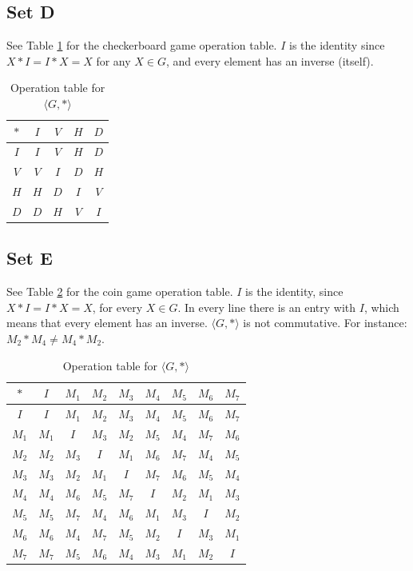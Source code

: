 \documentclass{article}
\begin{document}
\subsection{Set D}
See Table \ref{tab:checkerboard} for the checkerboard game operation table. $I$ is the identity since $X * I = I * X= X$ for any $X \in G$, and every element has an inverse (itself).
\begin{table}[H]
    \centering
    \begin{tabular}{c|cccc}
    $*$ & $I$ & $V$ & $H$ & $D$ \\ \hline
    $I$ & $I$ & $V$ & $H$ & $D$ \\
    $V$ & $V$ & $I$ & $D$ & $H$ \\
    $H$ & $H$ & $D$ & $I$ & $V$ \\
    $D$ & $D$ & $H$ & $V$ & $I$
    \end{tabular}
    \caption{Operation table for $\langle G, *\rangle$}
    \label{tab:checkerboard}
\end{table}

\subsection{Set E}
See Table \ref{tab:coingame-op} for the coin game operation table. $I$ is the identity, since $X * I = I * X = X$, for every $X \in G$. 
In every line there is an entry with $I$, which means that every element has an inverse.
$\langle G, *\rangle$ is not commutative. For instance: $M_2 * M_4 \ne M_4 * M_2$.

\begin{table}[!hb]
    \centering
    \begin{tabular}{c|cccccccc}
    $*$ & $I$ & $M_1$ & $M_2$ & $M_3$ & $M_4$ & $M_5$ & $M_6$ & $M_7$ \\ \hline
    $I$ & $I$ & $M_1$ & $M_2$ & $M_3$ & $M_4$ & $M_5$ & $M_6$ & $M_7$ \\
    $M_1$ & $M_1$ & $I$ & $M_3$ & $M_2$ & $M_5$ & $M_4$ & $M_7$ & $M_6$ \\
    $M_2$ & $M_2$ & $M_3$ & $I$ & $M_1$ & $M_6$ & $M_7$ & $M_4$ & $M_5$ \\
    $M_3$ & $M_3$ & $M_2$ & $M_1$ & $I$ & $M_7$ & $M_6$ & $M_5$ & $M_4$ \\
    $M_4$ & $M_4$ & $M_6$ & $M_5$ & $M_7$ & $I$ & $M_2$ & $M_1$ & $M_3$ \\
    $M_5$ & $M_5$ & $M_7$ & $M_4$ & $M_6$ & $M_1$ & $M_3$ & $I$ & $M_2$ \\
    $M_6$ & $M_6$ & $M_4$ & $M_7$ & $M_5$ & $M_2$ & $I$ & $M_3$ & $M_1$ \\
    $M_7$ & $M_7$ & $M_5$ & $M_6$ & $M_4$ & $M_3$ & $M_1$ & $M_2$ & $I$
    \end{tabular}
    \caption{Operation table for $\langle G, *\rangle$}
    \label{tab:coingame-op}
\end{table}
\end{document}
